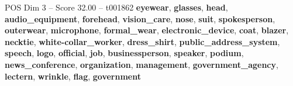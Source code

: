 \begin{textsample}{POS Dim 3 – Score 32.00 – t001862}  \label{ex:f3_pos_012}
\textbf{eyewear}, \textbf{glasses}, \textbf{head}, \textbf{audio\_equipment}, \textbf{forehead}, \textbf{vision\_care}, \textbf{nose}, \textbf{suit}, \textbf{spokesperson}, \textbf{outerwear}, \textbf{microphone}, \textbf{formal\_wear}, \textbf{electronic\_device}, \textbf{coat}, \textbf{blazer}, \textbf{necktie}, \textbf{white-collar\_worker}, \textbf{dress\_shirt}, \textbf{public\_address\_system}, \textbf{speech}, \textbf{logo}, \textbf{official}, \textbf{job}, \textbf{businessperson}, \textbf{speaker}, \textbf{podium}, \textbf{news\_conference}, \textbf{organization}, \textbf{management}, \textbf{government\_agency}, \textbf{lectern}, \textbf{wrinkle}, \textbf{flag}, \textbf{government}

\end{textsample}
